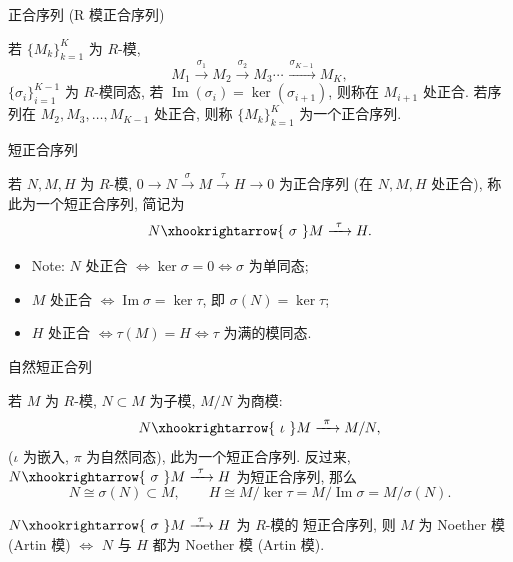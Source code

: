 \begin{frame}{正合序列 (R 模正合序列)}

\begin{Def}[正合序列]
若 $\{M_k\}_{k=1}^{K}$ 为 $R$-模,
\[
M_1 \xrightarrow{\ \sigma_1\ } M_2 \xrightarrow{\ \sigma_2\ } M_3
\dotsm \xrightarrow{\ \sigma_{K-1}\ } M_K ,
\]
$\{\sigma_i\}_{i=1}^{K-1}$ 为 $R$-模同态, 若
$\operatorname{Im}(\sigma_i) = \ker(\sigma_{i+1})$,
则称在 $M_{i+1}$ 处正合.
若序列在 $M_2, M_3, \dots, M_{K-1}$ 处正合,
则称 $\{M_k\}_{k=1}^{K}$ 为一个\alert{正合序列}.
\end{Def}

\end{frame}


\begin{frame}{短正合序列}

\begin{Def}[短正合序列]
若 $N, M, H$ 为 $R$-模,
$0 \to N \xrightarrow{\ \sigma\ } M \xrightarrow{\ \tau\ } H \to 0$
为正合序列 (在 $N, M, H$ 处正合), 称此为一个短正合序列, 简记为
\[
N \xhookrightarrow{\ \sigma\ } M \xrightarrow{\ \tau\ } H .
\]
\end{Def}

\begin{itemize}
\item Note: $N$ 处正合 $\iff \ker \sigma = 0 \iff \sigma$ 为单同态;
\item $M$ 处正合 $\iff \operatorname{Im} \sigma = \ker \tau$,
  即 $\sigma(N) = \ker \tau$;
\item $H$ 处正合 $\iff \tau(M) = H \iff \tau$ 为满的模同态.
\end{itemize}

\end{frame}


\begin{frame}{自然短正合列}

\begin{eg}[自然短正合列]
若 $M$ 为 $R$-模, $N \subset M$ 为子模, $M/N$ 为商模:
\[
N \xhookrightarrow{\ \iota\ } M \xrightarrow{\ \pi\ } M/N ,
\]
($\iota$ 为嵌入, $\pi$ 为自然同态), 此为一个短正合序列.
反过来, $N \xhookrightarrow{\ \sigma\ } M \xrightarrow{\ \tau\ } H$
为短正合序列, 那么
\[
N \cong \sigma(N) \subset M,
\qquad
H \cong M/\ker \tau = M/\operatorname{Im} \sigma = M/\sigma(N).
\]
\end{eg}

\pause

\begin{cor}
$N \xhookrightarrow{\ \sigma\ } M \xrightarrow{\ \tau\ } H$ 为 $R$-模的
短正合序列, 则
$M$ 为 Noether 模 (Artin 模) $\iff$ $N$ 与 $H$ 都为 Noether 模 (Artin 模).
\end{cor}

\end{frame}


